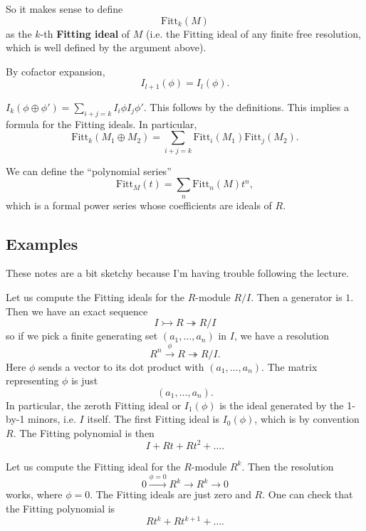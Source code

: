 \begin{definition} 
So it makes sense to define
\[ \mathrm{Fitt}_k(M)  \]
as the $k$-th \textbf{Fitting ideal} of $M$ (i.e. the Fitting ideal of any
finite free resolution, which is well defined by the argument above).
\end{definition} 

\begin{remark} 
By cofactor expansion,
\[ I_{l+1}(\phi) = I_l(\phi).  \]
\end{remark} 


\begin{remark} 
$I_k(\phi \oplus \phi') = \sum_{i + j = k} I_i\phi I_j \phi'$. This follows by
the definitions. This implies a formula for the Fitting ideals. In particular, 
\[ \mathrm{Fitt}_k(M_1 \oplus M_2) = \sum_{i+j=k} \mathrm{Fitt}_i(M_1)
\mathrm{Fitt}_j (M_2).  \]
\end{remark} 

We can define the ``polynomial series''
\[ \mathrm{Fitt}_M(t) = \sum_n \mathrm{Fitt}_n(M) t^n ,  \]
which is a formal power series whose coefficients are ideals of $R$. 

\subsection{Examples}

These notes are a bit sketchy because I'm having trouble following the lecture.



\begin{example} 
Let us compute the Fitting ideals for the $R$-module $R/I$. Then a generator is $1$. Then we
have an exact sequence
\[ I \rightarrowtail  R \twoheadrightarrow R/I  \]
so if we pick a finite generating set $(a_1, \dots, a_n) $ in $I$, we have a
resolution
\[ R^n \stackrel{\phi}{\to} R \twoheadrightarrow R/I.  \]
Here $\phi$ sends a vector to its dot product with $(a_1, \dots, a_n)$. The
matrix representing $\phi$ is just 
\[ (a_1, \dots, a_n).  \]
In particular, the zeroth Fitting ideal or $I_1(\phi)$ is the ideal generated
by the 1-by-1 minors, i.e. $I$ itself. The first Fitting ideal is $I_0(\phi)$,
which is by convention $R$. The Fitting polynomial is then
\[ I + Rt  + Rt^2 + \dots.  \]
\end{example} 

\begin{example} 
Let us compute the Fitting ideal for the $R$-module $R^k$. Then the resolution
\[  0 \stackrel{\phi = 0}{\to} R^k \to R^k \to 0 \]
works, where $\phi=0$. The Fitting ideals are just zero and $R$. 
One can check that the Fitting polynomial is 
\[ Rt^k + Rt^{k+1} + \dots.  \]
\end{example} 


